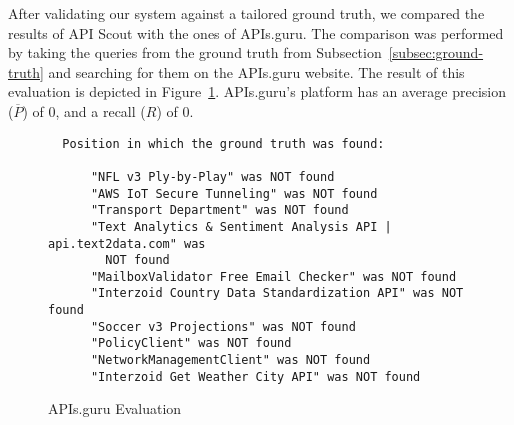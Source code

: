 After validating our system against a tailored ground truth, we compared the results of API Scout with the ones of APIs.guru.
The comparison was performed by taking the queries from the ground truth from Subsection~\ref{subsec:ground-truth} and searching for them on the APIs.guru website.
The result of this evaluation is depicted in Figure~\ref{fig:apis-guru-eval}.
APIs.guru's platform has an average precision ($\overline{P}$) of 0, and a recall ($R$) of 0.
\begin{figure}[h]
    \begin{verbatim}
  Position in which the ground truth was found:

      "NFL v3 Ply-by-Play" was NOT found
      "AWS IoT Secure Tunneling" was NOT found
      "Transport Department" was NOT found
      "Text Analytics & Sentiment Analysis API | api.text2data.com" was
        NOT found
      "MailboxValidator Free Email Checker" was NOT found
      "Interzoid Country Data Standardization API" was NOT found
      "Soccer v3 Projections" was NOT found
      "PolicyClient" was NOT found
      "NetworkManagementClient" was NOT found
      "Interzoid Get Weather City API" was NOT found
    \end{verbatim}
    \caption{APIs.guru Evaluation}
    \label{fig:apis-guru-eval}
\end{figure}
